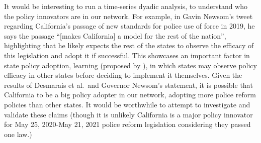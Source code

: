 \documentclass[12pt]{article}
\begin{document}
It would be interesting to run a time-series dyadic analysis, to
understand who the policy innovators are in our network. For example, in
Gavin Newsom's tweet regarding California's passage of new standards for
police use of force in 2019, he says the passage ``{[}makes
California{]} a model for the rest of the nation'', highlighting that he
likely expects the rest of the states to observe the efficacy of this
legislation and adopt it if successful. This showcases an important
factor in state policy adoption, learning (proposed by \citet{Shipan}),
in which states may observe policy efficacy in other states before
deciding to implement it themselves. Given the results of Desmarais et
al.~and Governor Newsom's statement, it is possible that California to
be a big policy adopter in our network, adopting more police reform
policies than other states. It would be worthwhile to attempt to
investigate and validate these claims (though it is unlikely California
is a major policy innovator for May 25, 2020-May 21, 2021 police reform
legislation considering they passed one law.)



\end{document}
